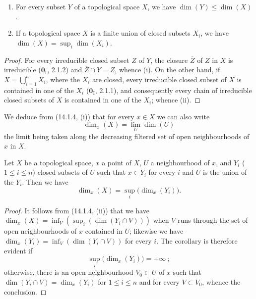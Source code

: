 \begin{proposition}[14.1.4]
\label{0.14.1.4}
\begin{enumerate}
  \item[\rm(i)] For every subset $Y$ of a topological space $X$, we have
  $\dim(Y)\leq\dim(X)$.
  \item[\rm(ii)] If a topological space $X$ is a finite union of closed
  subsets $X_i$, we have $\dim(X)=\sup_i\dim(X_i)$.
\end{enumerate}
\end{proposition}

\begin{proof}
For every irreducible closed subset $Z$ of $Y$, the closure $\overline Z$ of
$Z$ in $X$ is irreducible ($\mathbf{0}_{\mathrm I}$, 2.1.2) and
$\overline Z\cap Y=Z$, whence (i). On the other hand, if
$X=\bigcup_{i=1}^n X_i$, where the $X_i$ are closed, every irreducible closed
subset of $X$ is contained in one of the $X_i$ ($\mathbf{0}_{\mathrm I}$, 2.1.1),
and consequently every chain of irreducible closed subsets of $X$ is contained
in one of the $X_i$; whence (ii).
\end{proof}

We deduce from (14.1.4, (i)) that for every $x\in X$ we can also write
\[
  \dim_x(X)=\lim_U\dim(U)
  \tag{14.1.4.1}\label{0.14.1.4.1}
\]
the limit being taken along the decreasing filtered set of open
neighbourhoods of $x$ in $X$.

\begin{corollary}[14.1.5]
\label{0.14.1.5}
Let $X$ be a topological space, $x$ a point of $X$, $U$ a neighbourhood of
$x$, and $Y_i$ \textup{($1\leq i\leq n$)} closed subsets of $U$ such that
$x\in Y_i$ for every $i$ and $U$ is the union of the $Y_i$. Then we have
\[
  \dim_x(X)=\sup_i\bigl(\dim_x(Y_i)\bigr).
  \tag{14.1.5.1}\label{0.14.1.5.1}
\]
\end{corollary}

\begin{proof}
It follows from (14.1.4, (ii)) that we have
$\dim_x(X)=\inf_V(\sup_i(\dim(Y_i\cap V)))$ when $V$ runs through the set
of open neighbourhoods of $x$ contained in $U$; likewise we have
$\dim_x(Y_i)=\inf_V(\dim(Y_i\cap V))$ for every $i$. The corollary is therefore
evident if
\[
  \sup_i\bigl(\dim_x(Y_i)\bigr)=+\infty~;
\]
otherwise, there is an open neighbourhood $V_0\subset U$ of $x$ such
that $\dim(Y_i\cap V)=\dim_x(Y_i)$ for $1\leq i\leq n$ and for every
$V\subset V_0$, whence the conclusion.
\end{proof}

